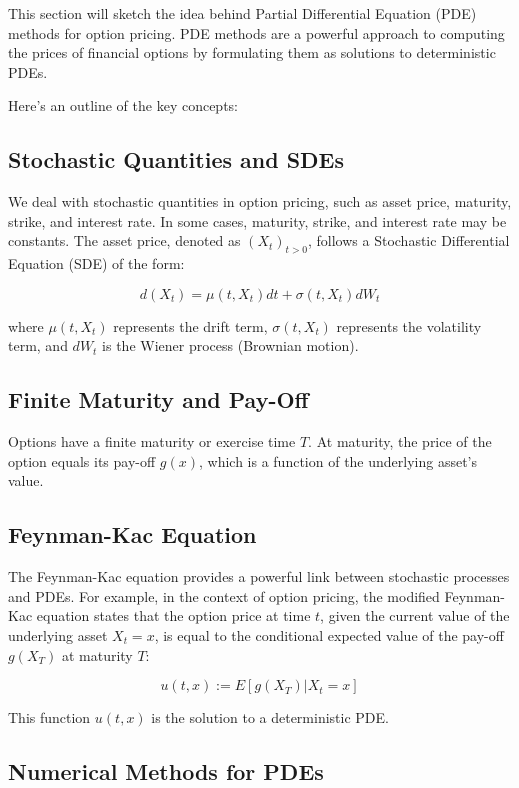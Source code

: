 This section will sketch the idea behind Partial Differential Equation (PDE) methods for option pricing. PDE methods are a powerful approach to computing the prices of financial options by formulating them as solutions to deterministic PDEs.

Here's an outline of the key concepts:

\subsection{Stochastic Quantities and SDEs}

We deal with stochastic quantities in option pricing, such as asset price, maturity, strike, and interest rate. In some cases, maturity, strike, and interest rate may be constants. The asset price, denoted as ${(X_t)}_{t > 0}$, follows a Stochastic Differential Equation (SDE) of the form:

\[
d(X_t) = \mu(t, X_t) dt + \sigma(t, X_t) dW_t
\]

where $\mu(t, X_t)$ represents the drift term, $\sigma(t, X_t)$ represents the volatility term, and $dW_t$ is the Wiener process (Brownian motion).

\subsection{Finite Maturity and Pay-Off}

Options have a finite maturity or exercise time $T$. At maturity, the price of the option equals its pay-off $g(x)$, which is a function of the underlying asset's value.

\subsection{Feynman-Kac Equation}

The Feynman-Kac equation provides a powerful link between stochastic processes and PDEs. For example, in the context of option pricing, the modified Feynman-Kac equation states that the option price at time $t$, given the current value of the underlying asset $X_t = x$, is equal to the conditional expected value of the pay-off $g(X_T)$ at maturity $T$:

\[
u(t, x) := E[g(X_T) | X_t = x]
\]

This function $u(t, x)$ is the solution to a deterministic PDE.

\subsection{Numerical Methods for PDEs}

